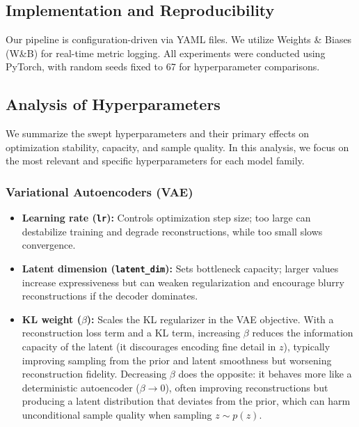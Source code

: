 \documentclass[runningheads]{llncs}
\begin{document}
\subsection{Implementation and Reproducibility}
Our pipeline is configuration-driven via YAML files. We utilize Weights \& Biases (W\&B) for real-time metric logging. All experiments were conducted using PyTorch, with random seeds fixed to 67 for hyperparameter comparisons.

\subsection{Analysis of Hyperparameters}
We summarize the swept hyperparameters and their primary effects on optimization stability, capacity, and sample quality. In this analysis, we focus on the most relevant and specific hyperparameters for each model family.

\subsubsection{Variational Autoencoders (VAE)}
\begin{itemize}
    \item \textbf{Learning rate (\texttt{lr}):} Controls optimization step size; too large can destabilize training and degrade reconstructions, while too small slows convergence.
    \item \textbf{Latent dimension (\texttt{latent\_dim}):} Sets bottleneck capacity; larger values increase expressiveness but can weaken regularization and encourage blurry reconstructions if the decoder dominates.
    \item \textbf{KL weight ($\beta$):} Scales the KL regularizer in the VAE objective. With a reconstruction loss term and a KL term, increasing $\beta$ reduces the information capacity of the latent (it discourages encoding fine detail in $z$), typically improving sampling from the prior and latent smoothness but worsening reconstruction fidelity. Decreasing $\beta$ does the opposite: it behaves more like a deterministic autoencoder ($\beta \to 0$), often improving reconstructions but producing a latent distribution that deviates from the prior, which can harm unconditional sample quality when sampling $z\sim p(z)$.
\end{itemize}
\end{document}
